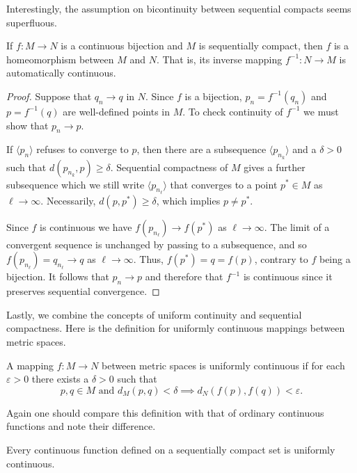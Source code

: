 Interestingly, the assumption on bicontinuity between sequential compacts seems superfluous.

\begin{thm}
  If $f: M \to N$ is a continuous bijection and $M$ is sequentially compact, then $f$ is a homeomorphism between $M$ and $N$.
  That is, its inverse mapping $f^{-1}: N \to M$ is automatically continuous.
\end{thm}

\begin{proof}
  Suppose that $q_n \to q$ in $N$.
  Since $f$ is a bijection, $p_n = f^{-1}(q_n)$ and $p = f^{-1}(q)$ are well-defined points in $M$.
  To check continuity of $f^{-1}$ we must show that $p_n \to p$.

  If $\langle p_n \rangle$ refuses to converge to $p$, then there are a subsequence $\langle p_{n_k}\rangle$ and a $\delta > 0$ such that $d(p_{n_k}, p) \geqslant \delta$. 
  Sequential compactness of $M$ gives a further subsequence which we still write $\langle p_{n_\ell} \rangle$ that converges to a point $p^* \in M$ as $\ell \to \infty$.
  Necessarily, $d(p,p^*) \geqslant \delta$, which implies $p \ne p^*$.

Since $f$ is continuous we have $f(p_{n_\ell}) \to f(p^*)$ as $\ell \to \infty$.
The limit of a convergent sequence is unchanged by passing to a subsequence, and so $f(p_{n_\ell}) = q_{n_\ell} \to q$ as $\ell \to \infty$.
Thus, $f(p^*) = q = f(p)$, contrary to $f$ being a bijection.
It follows that $p_n \to p$ and therefore that $f^{-1}$ is continuous since it preserves sequential convergence.
\end{proof}

Lastly, we combine the concepts of uniform continuity and sequential compactness.
Here is the definition for uniformly continuous mappings between metric spaces.

\begin{defn}
  A mapping $f: M \to N$ between metric spaces is \textsf{uniformly continuous} if for each $\varepsilon > 0$ there exists a $\delta > 0$ such that
  \[
    p, q \in M \text{ and } d_M(p,q) < \delta \implies
    d_N(f(p), f(q)) < \varepsilon.
  \]
\end{defn}

Again one should compare this definition with that of ordinary continuous functions and note their difference.

\begin{thm}
  Every continuous function defined on a sequentially compact set is uniformly continuous.
\end{thm}

